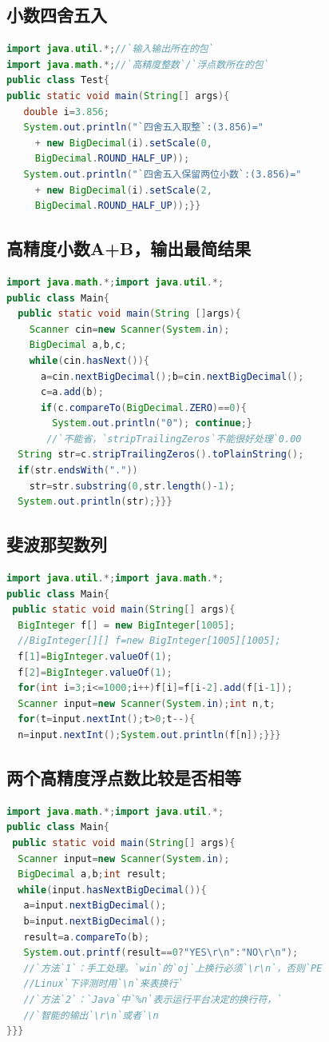 \documentclass[UTF8,a4paper,titlepage]{ctexart}
\begin{document}
\subsection{小数四舍五入}
\begin{lstlisting}[language=Java]
import java.util.*;//`输入输出所在的包`
import java.math.*;//`高精度整数`/`浮点数所在的包`
public class Test{
public static void main(String[] args){
   double i=3.856;
   System.out.println("`四舍五入取整`:(3.856)="
     + new BigDecimal(i).setScale(0,
     BigDecimal.ROUND_HALF_UP));
   System.out.println("`四舍五入保留两位小数`:(3.856)="
     + new BigDecimal(i).setScale(2,
     BigDecimal.ROUND_HALF_UP));}}
\end{lstlisting}
\subsection{高精度小数A+B，输出最简结果}
\begin{lstlisting}[language=Java]
import java.math.*;import java.util.*;
public class Main{
  public static void main(String []args){
    Scanner cin=new Scanner(System.in);
    BigDecimal a,b,c;
    while(cin.hasNext()){
      a=cin.nextBigDecimal();b=cin.nextBigDecimal();
      c=a.add(b);
      if(c.compareTo(BigDecimal.ZERO)==0){
        System.out.println("0"); continue;}
       //`不能省，`stripTrailingZeros`不能很好处理`0.00
  String str=c.stripTrailingZeros().toPlainString();
  if(str.endsWith("."))
    str=str.substring(0,str.length()-1);
  System.out.println(str);}}}
\end{lstlisting}
\subsection{斐波那契数列}
\begin{lstlisting}[language=Java]
import java.util.*;import java.math.*;
public class Main{
 public static void main(String[] args){
  BigInteger f[] = new BigInteger[1005];
  //BigInteger[][] f=new BigInteger[1005][1005];
  f[1]=BigInteger.valueOf(1);
  f[2]=BigInteger.valueOf(1);
  for(int i=3;i<=1000;i++)f[i]=f[i-2].add(f[i-1]);
  Scanner input=new Scanner(System.in);int n,t;
  for(t=input.nextInt();t>0;t--){
  n=input.nextInt();System.out.println(f[n]);}}}
\end{lstlisting}
\subsection{两个高精度浮点数比较是否相等}
\begin{lstlisting}[language=Java]
import java.math.*;import java.util.*;
public class Main{
 public static void main(String[] args){
  Scanner input=new Scanner(System.in);
  BigDecimal a,b;int result;
  while(input.hasNextBigDecimal()){
   a=input.nextBigDecimal();
   b=input.nextBigDecimal();
   result=a.compareTo(b);
   System.out.printf(result==0?"YES\r\n":"NO\r\n");
   //`方法`1`：手工处理。`win`的`oj`上换行必须`\r\n`，否则`PE
   //Linux`下评测时用`\n`来表换行`
   //`方法`2`：`Java`中`%n`表示运行平台决定的换行符，`
   //`智能的输出`\r\n`或者`\n
}}}
\end{lstlisting}
\end{document}
